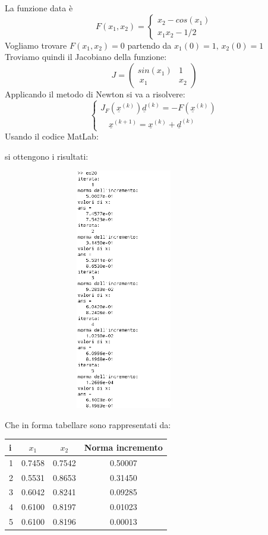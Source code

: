\begin{flushleft}
La funzione data è \[F(x_1, x_2)= \begin{cases}x_2-cos(x_1)\\ x_1x_2 -1/2\end{cases}\]
Vogliamo trovare $F(x_1, x_2)=0$ partendo da $x_1(0) = 1\mbox{, } x_2(0) = 1$\\
Troviamo quindi il Jacobiano della funzione: 
\[ 
J=\begin{pmatrix} sin(x_1) & 1  \\\ x_1 & x_2 \end{pmatrix}
\]
Applicando il metodo di Newton si va a risolvere:
\[
\begin{cases} 
J_F(\underline{x}^{(k)})\underline{d}^{(k)}=-F(\underline{x}^{(k)}) \\ 
\quad \underline{x}^{(k+1)}=\underline{x}^{(k)}+\underline{d}^{(k)} 
\end{cases}
\]
Usando il codice MatLab:


si ottengono i risultati:
\begin{figure}[H]
\includegraphics[left, width=320px, height=400px]{cap_3/es20/es320}
\end{figure}
Che in forma tabellare sono rappresentati da:
\begin{center}
\begin{tabular}{|l|c|c|c|}
\hline
i & $x_1$ & $x_2$ & Norma incremento \\
\hline
1 & 0.7458 & 0.7542 & 0.50007 \\
2 & 0.5531 & 0.8653 & 0.31450 \\
3 & 0.6042 & 0.8241 & 0.09285 \\
4 & 0.6100 & 0.8197 & 0.01023 \\
5 & 0.6100 & 0.8196 & 0.00013 \\ 
\hline
\end{tabular}
\end{center}
\end{flushleft}
